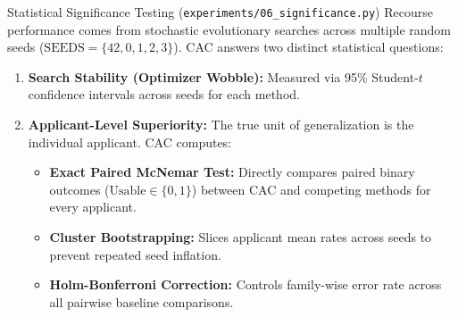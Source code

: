 \documentclass[11pt,a4paper]{article}
\begin{document}
\begin{parentconcept}{Statistical Significance Testing (\texttt{experiments/06\_significance.py})}
Recourse performance comes from stochastic evolutionary searches across multiple random seeds ($\text{SEEDS} = \{42, 0, 1, 2, 3\}$). CAC answers two distinct statistical questions:
\begin{enumerate}[leftmargin=1.5em]
    \item \textbf{Search Stability (Optimizer Wobble):} Measured via 95\% Student-$t$ confidence intervals across seeds for each method.
    \item \textbf{Applicant-Level Superiority:} The true unit of generalization is the individual applicant. CAC computes:
    \begin{itemize}
        \item \textbf{Exact Paired McNemar Test:} Directly compares paired binary outcomes ($\text{Usable} \in \{0, 1\}$) between CAC and competing methods for every applicant.
        \item \textbf{Cluster Bootstrapping:} Slices applicant mean rates across seeds to prevent repeated seed inflation.
        \item \textbf{Holm-Bonferroni Correction:} Controls family-wise error rate across all pairwise baseline comparisons.
    \end{itemize}
\end{enumerate}
\end{parentconcept}
\end{document}
